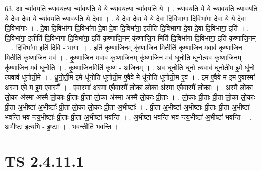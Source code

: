 \documentclass[17pt]{extarticle}
\begin{document}
63. आ च्या॑वयति च्यावय॒त्या च्या॑वयति॒ ये ये च्या॑वय॒त्या च्या॑वयति॒ ये । . च्या॒व॒य॒ति॒ ये ये च्या॑वयति च्यावयति॒ ये दे॒वा दे॒वा ये च्या॑वयति च्यावयति॒ ये दे॒वाः । . ये दे॒वा दे॒वा ये ये दे॒वा दि॒विभा॑गा दि॒विभा॑गा दे॒वा ये ये दे॒वा दि॒विभा॑गाः । . दे॒वा दि॒विभा॑गा दि॒विभा॑गा दे॒वा दे॒वा दि॒विभा॑गा॒ इतीति॑ दि॒विभा॑गा दे॒वा दे॒वा दि॒विभा॑गा॒ इति॑ । . दि॒विभा॑गा॒ इतीति॑ दि॒विभा॑गा दि॒विभा॑गा॒ इति॑ कृष्णाजि॒नम् कृ॑ष्णाजि॒न मिति॑ दि॒विभा॑गा दि॒विभा॑गा॒ इति॑ कृष्णाजि॒नम् । . दि॒विभा॑गा॒ इति॑ दि॒वि - भा॒गाः॒ । . इति॑ कृष्णाजि॒नम् कृ॑ष्णाजि॒न मितीति॑ कृष्णाजि॒न मवाव॑ कृष्णाजि॒न मितीति॑ कृष्णाजि॒न मव॑ । . कृ॒ष्णा॒जि॒न मवाव॑ कृष्णाजि॒नम् कृ॑ष्णाजि॒न मव॑ धूनोति धूनो॒त्यव॑ कृष्णाजि॒नम् कृ॑ष्णाजि॒न मव॑ धूनोति । . कृ॒ष्णा॒जि॒नमिति॑ कृष्ण - अ॒जि॒नम् । . अव॑ धूनोति धूनो॒ त्यवाव॑ धूनोती॒म इ॒मे धू॑नो॒ त्यवाव॑ धूनोती॒मे । . धू॒नो॒ती॒म इ॒मे धू॑नोति धूनोती॒म ए॒वैवे मे धू॑नोति धूनोती॒म ए॒व । . इ॒म ए॒वैवे म इ॒म ए॒वास्मा॑ अस्मा ए॒वे म इ॒म ए॒वास्मै᳚ । . ए॒वास्मा॑ अस्मा ए॒वैवास्मै॑ लो॒का लो॒का अ॑स्मा ए॒वैवास्मै॑ लो॒काः । . अ॒स्मै॒ लो॒का लो॒का अ॑स्मा अस्मै लो॒काः प्री॒ताः प्री॒ता लो॒का अ॑स्मा अस्मै लो॒काः प्री॒ताः । . लो॒काः प्री॒ताः प्री॒ता लो॒का लो॒काः प्री॒ता अ॒भीष्टा॑ अ॒भीष्टाः᳚ प्री॒ता लो॒का लो॒काः प्री॒ता अ॒भीष्टाः᳚ । . प्री॒ता अ॒भीष्टा॑ अ॒भीष्टाः᳚ प्री॒ताः प्री॒ता अ॒भीष्टा॑ भवन्ति भव न्त्य॒भीष्टाः᳚ प्री॒ताः प्री॒ता अ॒भीष्टा॑ भवन्ति । . अ॒भीष्टा॑ भवन्ति भव न्त्य॒भीष्टा॑ अ॒भीष्टा॑ भवन्ति । . अ॒भीष्टा॒ इत्य॒भि - इ॒ष्टाः॒ । . भ॒व॒न्तीति॑ भवन्ति । \newline
\pagebreak
{}

\section{ TS 2.4.11.1 }
\end{document}
